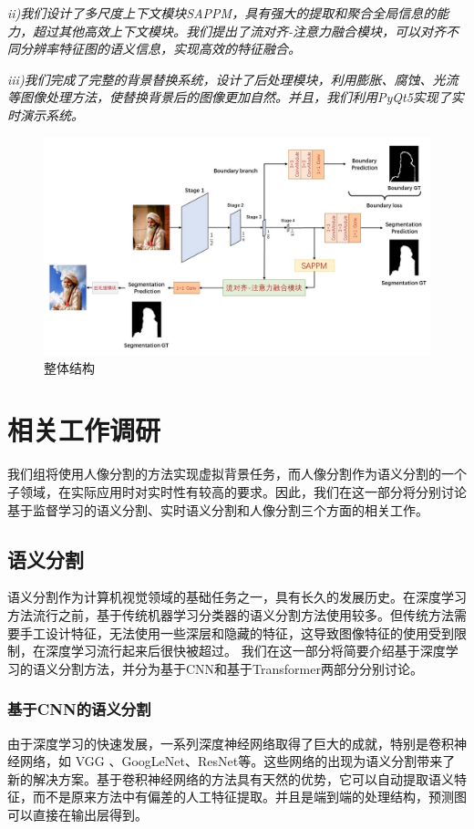 \documentclass[11pt]{article}
\begin{document}
\textit{ii)我们设计了多尺度上下文模块SAPPM，具有强大的提取和聚合全局信息的能力，超过其他高效上下文模块。我们提出了流对齐-注意力融合模块，可以对齐不同分辨率特征图的语义信息，实现高效的特征融合。}

\textit{iii)我们完成了完整的背景替换系统，设计了后处理模块，利用膨胀、腐蚀、光流等图像处理方法，使替换背景后的图像更加自然。并且，我们利用PyQt5实现了实时演示系统。}

\begin{figure}[H]
  \centering
  \includegraphics[width=15cm]{net.jpg}
  \caption{整体结构}
  \label{fig:net}
\end{figure}

\section{相关工作调研}
我们组将使用人像分割的方法实现虚拟背景任务，而人像分割作为语义分割的一个子领域，在实际应用时对实时性有较高的要求。因此，我们在这一部分将分别讨论基于监督学习的语义分割、实时语义分割和人像分割三个方面的相关工作。


\subsection{语义分割}
语义分割作为计算机视觉领域的基础任务之一，具有长久的发展历史。在深度学习方法流行之前，基于传统机器学习分类器的语义分割方法使用较多。但传统方法需要手工设计特征，无法使用一些深层和隐藏的特征，这导致图像特征的使用受到限制，在深度学习流行起来后很快被超过。
我们在这一部分将简要介绍基于深度学习的语义分割方法，并分为基于CNN和基于Transformer两部分分别讨论。
\subsubsection{基于CNN的语义分割}
由于深度学习的快速发展，一系列深度神经网络取得了巨大的成就，特别是卷积神经网络，如 VGG \cite{VGG}、GoogLeNet\cite{goo}、ResNet\cite{res}等。这些网络的出现为语义分割带来了新的解决方案。基于卷积神经网络的方法具有天然的优势，它可以自动提取语义特征，而不是原来方法中有偏差的人工特征提取。并且是端到端的处理结构，预测图可以直接在输出层得到。 
\end{document}
